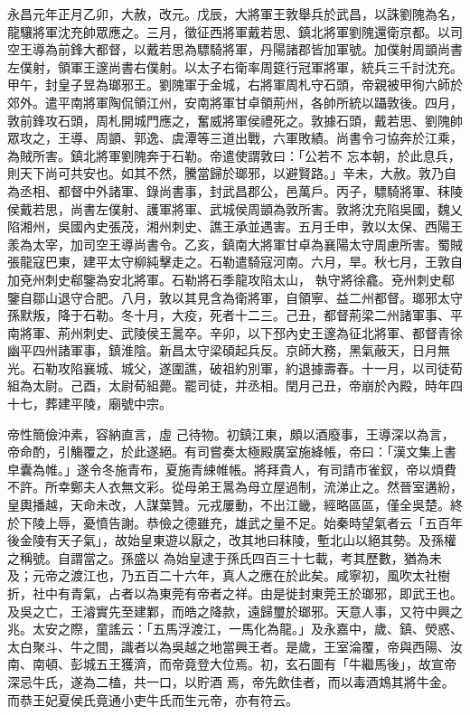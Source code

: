 \begin{pinyinscope}
 永昌元年正月乙卯，大赦，改元。戊辰，大將軍王敦舉兵於武昌，以誅劉隗為名，龍驤將軍沈充帥眾應之。三月，徵征西將軍戴若思、鎮北將軍劉隗還衛京都。以司
 空王導為前鋒大都督，以戴若思為驃騎將軍，丹陽諸郡皆加軍號。加僕射周顗尚書左僕射，領軍王邃尚書右僕射。以太子右衛率周筵行冠軍將軍，統兵三千討沈充。甲午，封皇子昱為瑯邪王。劉隗軍于金城，右將軍周札守石頭，帝親被甲徇六師於郊外。遣平南將軍陶侃領江州，安南將軍甘卓領荊州，各帥所統以躡敦後。四月，敦前鋒攻石頭，周札開城門應之，奮威將軍侯禮死之。敦據石頭，戴若思、劉隗帥眾攻之，王導、周顗、郭逸、虞潭等三道出戰，六軍敗績。尚書令刁協奔於江乘，為賊所害。鎮北將軍劉隗奔于石勒。帝遣使謂敦曰：「公若不
 忘本朝，於此息兵，則天下尚可共安也。如其不然，騰當歸於瑯邪，以避賢路。」辛未，大赦。敦乃自為丞相、都督中外諸軍、錄尚書事，封武昌郡公，邑萬戶。丙子，驃騎將軍、秣陵侯戴若思，尚書左僕射、護軍將軍、武城侯周顗為敦所害。敦將沈充陷吳國，魏乂陷湘州，吳國內史張茂，湘州刺史、譙王承並遇害。五月壬申，敦以太保、西陽王羕為太宰，加司空王導尚書令。乙亥，鎮南大將軍甘卓為襄陽太守周慮所害。蜀賊張龍寇巴東，建平太守柳純擊走之。石勒遣騎寇河南。六月，旱。秋七月，王敦自加兗州刺史郗鑒為安北將軍。石勒將石季龍攻陷太山，
 執守將徐龕。兗州刺史郗鑒自鄒山退守合肥。八月，敦以其見含為衛將軍，自領寧、益二州都督。瑯邪太守孫默叛，降于石勒。冬十月，大疫，死者十二三。己丑，都督荊梁二州諸軍事、平南將軍、荊州刺史、武陵侯王暠卒。辛卯，以下邳內史王邃為征北將軍、都督青徐幽平四州諸軍事，鎮淮陰。新昌太守梁碩起兵反。京師大務，黑氣蔽天，日月無光。石勒攻陷襄城、城父，遂圍譙，破祖約別軍，約退據壽春。十一月，以司徒荀組為太尉。己酉，太尉荀組薨。罷司徒，并丞相。閏月己丑，帝崩於內殿，時年四十七，葬建平陵，廟號中宗。



 帝性簡儉沖素，容納直言，虛
 己待物。初鎮江東，頗以酒廢事，王導深以為言，帝命酌，引觴覆之，於此遂絕。有司嘗奏太極殿廣室施絳帳，帝曰：「漢文集上書皁囊為帷。」遂令冬施青布，夏施青綀帷帳。將拜貴人，有司請市雀釵，帝以煩費不許。所幸鄭夫人衣無文彩。從母弟王暠為母立屋過制，流涕止之。然晉室遘紛，皇輿播越，天命未改，人謀葉贊。元戎屢動，不出江畿，經略區區，僅全吳楚。終於下陵上辱，憂憤告謝。恭儉之德雖充，雄武之量不足。始秦時望氣者云「五百年後金陵有天子氣」，故始皇東遊以厭之，改其地曰秣陵，塹北山以絕其勢。及孫權之稱號。自謂當之。孫盛以
 為始皇逮于孫氏四百三十七載，考其歷數，猶為未及；元帝之渡江也，乃五百二十六年，真人之應在於此矣。咸寧初，風吹太社樹折，社中有青氣，占者以為東莞有帝者之祥。由是徙封東莞王於瑯邪，即武王也。及吳之亡，王濬實先至建鄴，而皓之降款，遠歸璽於瑯邪。天意人事，又符中興之兆。太安之際，童謠云：「五馬浮渡江，一馬化為龍。」及永嘉中，歲、鎮、熒惑、太白聚斗、牛之間，識者以為吳越之地當興王者。是歲，王室淪覆，帝與西陽、汝南、南頓、彭城五王獲濟，而帝竟登大位焉。初，玄石圖有「牛繼馬後」，故宣帝深忌牛氏，遂為二榼，共一口，以貯酒
 焉，帝先飲佳者，而以毒酒鴆其將牛金。而恭王妃夏侯氏竟通小吏牛氏而生元帝，亦有符云。




\end{pinyinscope}
